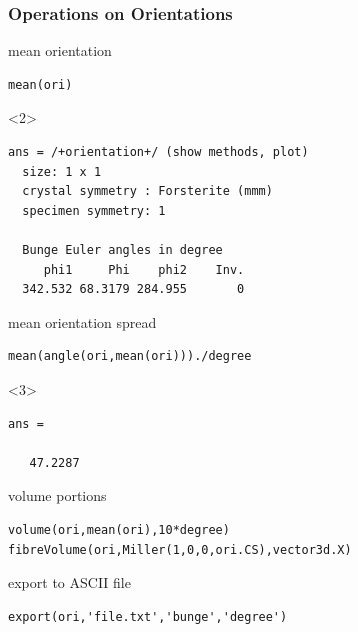 \documentclass[compress]{beamer}
\begin{document}
\begin{frame}[fragile]
  \frametitle{Operations on Orientations}




mean orientation
  \begin{lstlisting}[style=input]
mean(ori)
  \end{lstlisting}

  \begin{onlyenv}<2>
    \begin{lstlisting}[style=output]
ans = /+orientation+/ (show methods, plot)
  size: 1 x 1
  crystal symmetry : Forsterite (mmm)
  specimen symmetry: 1

  Bunge Euler angles in degree
     phi1     Phi    phi2    Inv.
  342.532 68.3179 284.955       0
    \end{lstlisting}
  \end{onlyenv}

\pause
\medskip

  mean orientation spread
  \begin{lstlisting}[style=input]
mean(angle(ori,mean(ori)))./degree
  \end{lstlisting}

  \begin{onlyenv}<3>
    \begin{lstlisting}[style=output]
ans =

   47.2287
\end{lstlisting}
  \end{onlyenv}

\pause
\medskip

volume portions
\begin{lstlisting}[style=input]
volume(ori,mean(ori),10*degree)
fibreVolume(ori,Miller(1,0,0,ori.CS),vector3d.X)
\end{lstlisting}

\pause
\medskip

export to ASCII file
\begin{lstlisting}[style=input]
export(ori,'file.txt','bunge','degree')
\end{lstlisting}

\end{frame}
\end{document}
